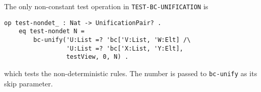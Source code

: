 \documentclass[11pt]{article}
\begin{document}

\vspace{1ex}

The only non-constant test operation in \lstinline|TEST-BC-UNIFICATION| is
\begin{lstlisting}[language=Maude, style=smalllisting]
    op test-nondet_ : Nat -> UnificationPair? .
    eq test-nondet N =
        bc-unify('U:List =? 'bc['V:List, 'W:Elt] /\
                 'U:List =? 'bc['X:List, 'Y:Elt],
                 testView, 0, N) .
\end{lstlisting}
which tests the non-deterministic rules. The number is passed to
\lstinline|bc-unify| as its skip parameter.
\vspace{1ex}


\end{document}
